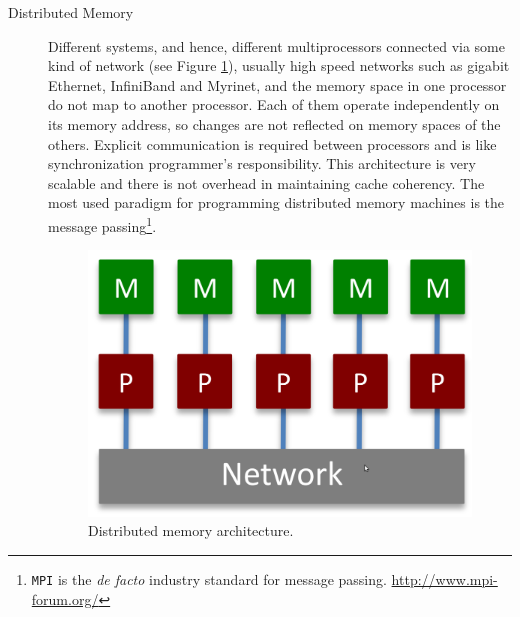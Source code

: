 \begin{description}
\begin{description}
	\item [Distributed Memory] 	Different systems, and hence, different multiprocessors connected via some kind of network (see Figure \ref{fig:distribuiteMemory}), usually high speed networks such as gigabit Ethernet, InfiniBand and Myrinet, and the memory space in one processor do not map to another processor. Each of them operate independently on its memory address, so changes are not reflected on memory spaces of the others. Explicit communication is required between processors and is like synchronization	programmer's responsibility.
	This architecture  is very scalable and there is not  overhead in maintaining	cache coherency. 	
	The most used paradigm for programming distributed memory machines is the
	message passing\footnote{\texttt{MPI} is the \textit{de facto} industry standard for
	message passing. \url{http://www.mpi-forum.org/}}.
	\begin{figure}
		\centering
		\caption{Distributed memory architecture.}
		\label{fig:distribuiteMemory}
		\setlength{\fboxrule}{1pt}%
		\includegraphics[scale=0.25]{./images/parallel_programming/distribuitedMemory}
	\end{figure}
	

\end{description}
\end{description}
